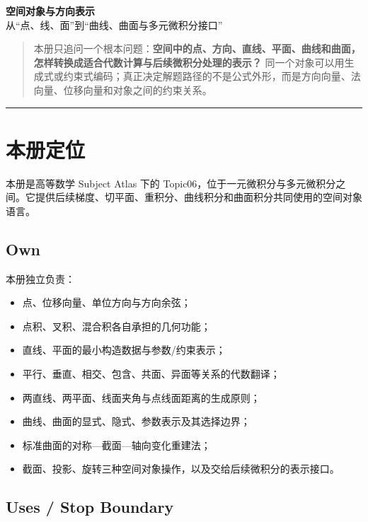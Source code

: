 \documentclass[11pt,a4paper]{ctexart}
\begin{document}
\begin{center}
{\LARGE\textbf{空间对象与方向表示}}\\[0.4em]
{\large 从“点、线、面”到“曲线、曲面与多元微积分接口”}
\end{center}
\vspace{0.5em}

\begin{quote}
本册只追问一个根本问题：\textbf{空间中的点、方向、直线、平面、曲线和曲面，怎样转换成适合代数计算与后续微积分处理的表示？} 同一个对象可以用生成式或约束式编码；真正决定解题路径的不是公式外形，而是方向向量、法向量、位移向量和对象之间的约束关系。
\end{quote}

\begin{center}\rule{0.5\linewidth}{0.5pt}\end{center}

\setcounter{section}{-1}
\section{本册定位}

本册是高等数学 Subject Atlas 下的 Topic06，位于一元微积分与多元微积分之间。它提供后续梯度、切平面、重积分、曲线积分和曲面积分共同使用的空间对象语言。

\subsection{Own}

本册独立负责：
\begin{itemize}
  \item 点、位移向量、单位方向与方向余弦；
  \item 点积、叉积、混合积各自承担的几何功能；
  \item 直线、平面的最小构造数据与参数/约束表示；
  \item 平行、垂直、相交、包含、共面、异面等关系的代数翻译；
  \item 两直线、两平面、线面夹角与点线面距离的生成原则；
  \item 曲线、曲面的显式、隐式、参数表示及其选择边界；
  \item 标准曲面的对称—截面—轴向变化重建法；
  \item 截面、投影、旋转三种空间对象操作，以及交给后续微积分的表示接口。
\end{itemize}

\subsection{Uses / Stop Boundary}
\end{document}
